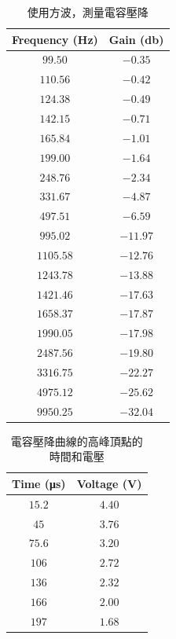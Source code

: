 \begin{table}[htb!]
\centering
\caption{使用方波，測量電容壓降}
\begin{tabular}{cc}
\toprule
Frequency (\unit{\Hz}) & Gain (\unit{\decibel}) \\
\midrule
$99.50$ & $-0.35$ \\
$110.56$ & $-0.42$ \\
$124.38$ & $-0.49$ \\
$142.15$ & $-0.71$ \\
$165.84$ & $-1.01$ \\
$199.00$ & $-1.64$ \\
$248.76$ & $-2.34$ \\
$331.67$ & $-4.87$ \\
$497.51$ & $-6.59$ \\
$995.02$ & $-11.97$ \\
$1105.58$ & $-12.76$ \\
$1243.78$ & $-13.88$ \\
$1421.46$ & $-17.63$ \\
$1658.37$ & $-17.87$ \\
$1990.05$ & $-17.98$ \\
$2487.56$ & $-19.80$ \\
$3316.75$ & $-22.27$ \\
$4975.12$ & $-25.62$ \\
$9950.25$ & $-32.04$ \\
\bottomrule
\end{tabular}
\end{table}
\begin{table}[htb!]
\centering
\caption{電容壓降曲線的高峰頂點的時間和電壓}
\begin{tabular}{cc}
\toprule
Time (\unit{\us}) & Voltage (\unit{\V}) \\
\midrule
$15.2$ & $4.40$ \\
$45$ & $3.76$ \\
$75.6$ & $3.20$ \\
$106$ & $2.72$ \\
$136$ & $2.32$ \\
$166$ & $2.00$ \\
$197$ & $1.68$ \\
\bottomrule
\end{tabular}
\end{table}
